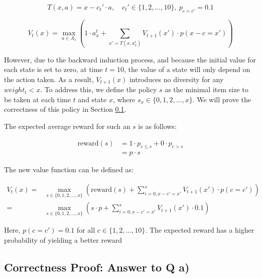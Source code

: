 \begin{equation}
T(x, a) = x - c_t' \cdot a, \quad c_t' \in \{1,2,\ldots,10\}, \ p_{c=c'} = 0.1
\end{equation}

\begin{equation}
V_t(x) = \max_{a \in A_x}\left(1 \cdot a_x^t + \sum_{x' = T(x, a_x^t)} V_{t+1}(x') \cdot p(x-c=x')\right)
\end{equation}

However, due to the backward induction process, and because the initial value for each state is set to zero, at time $t=10$, the value of a state will only depend on the action taken. As a result, $V_{t+1}(x)$ introduces no diversity for any $weight_t < x$. To address this, we define the policy $s$ as the minimal item size to be taken at each time $t$ and state $x$, where $s_x \in \{0,1,2,\ldots,x\}$. We will prove the correctness of this policy in Section \ref{sec:1.a}.

The expected average reward for such an $s$ is as follows:

\begin{equation}
\begin{aligned}
\text{reward}(s) & = 1 \cdot p_{c \leq s} + 0 \cdot p_{c > s} \\
& = p \cdot s
\end{aligned}
\end{equation}

The new value function can be defined as:

\begin{equation}
\begin{aligned}
V_t(x) = & \max_{s \in \{0,1,2,\ldots,x\}}\left(\text{reward}(s) + \sum_{i=0,x-c'=x'}^s V_{t+1}(x') \cdot p(c=c')\right) \\
=& \max_{s \in \{0,1,2,\ldots,x\}}\left(s \cdot p + \sum_{i=0,x-c'=x'}^s V_{t+1}(x') \cdot 0.1\right)
\end{aligned}
\end{equation}

Here, $p(c=c') = 0.1$ for all $c \in \{1,2,\ldots,10\}$.
The expected reward has a higher probability of yielding a better reward

\subsection{Correctness Proof: Answer to Q a)}
\label{sec:1.a}


